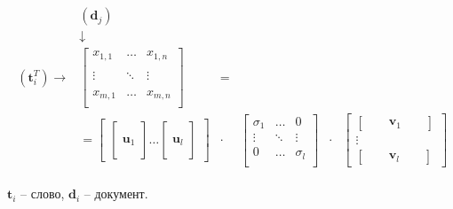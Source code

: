 \begin{eqnarray}\label{eq:svd}
{\displaystyle 
{\begin{matrix}

\\&({\textbf {d}}_{j})&&&&&&&\\&\downarrow &&&&&&& \\({\textbf {t}}_{i}^{T})\rightarrow &{
\begin{bmatrix}x_{1,1}&\dots &x_{1,n}\\\\\vdots &\ddots &\vdots \\\\x_{m,1}&\dots &x_{m,n}\\\end{bmatrix}}&=
\\&= {\begin{bmatrix}
{\begin{bmatrix}\,\\\,\\{\textbf {u}}_{1}\\\,\\\,\end{bmatrix}}\dots  
{\begin{bmatrix}\,\\\,\\{\textbf {u}}_{l}\\\,\\\,\end{bmatrix}}
\end{bmatrix}}&\cdot &
   {\begin{bmatrix}\sigma _{1}&\dots &0\\\vdots &\ddots &\vdots \\0&\dots &\sigma _{l}\\\end{bmatrix}}&\cdot &
   {\begin{bmatrix}
   {\begin{bmatrix}&&{\textbf {v}}_{1}&&\end{bmatrix}}\\\vdots \\
   {\begin{bmatrix}&&{\textbf {v}}_{l}&& \end{bmatrix}}
   \end{bmatrix}}
 \end{matrix}}}
\end{eqnarray}

${\textbf {t}}_{i}$  -- слово, ${\textbf {d}}_{i}$ -- документ.\\

